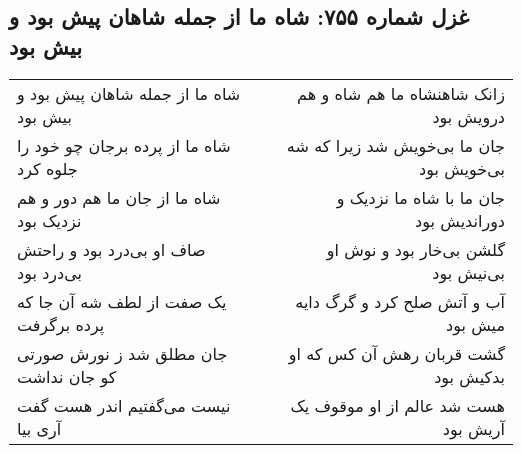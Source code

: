 \begin{center}
\section*{غزل شماره ۷۵۵: شاه ما از جمله شاهان پیش بود و بیش بود}
\label{sec:0755}
\begin{longtable}{l p{0.5cm} r}
شاه ما از جمله شاهان پیش بود و بیش بود
&&
زانک شاهنشاه ما هم شاه و هم درویش بود
\\
شاه ما از پرده برجان چو خود را جلوه کرد
&&
جان ما بی‌خویش شد زیرا که شه بی‌خویش بود
\\
شاه ما از جان ما هم دور و هم نزدیک بود
&&
جان ما با شاه ما نزدیک و دوراندیش بود
\\
صاف او بی‌درد بود و راحتش بی‌درد بود
&&
گلشن بی‌خار بود و نوش او بی‌نیش بود
\\
یک صفت از لطف شه آن جا که پرده برگرفت
&&
آب و آتش صلح کرد و گرگ دایه میش بود
\\
جان مطلق شد ز نورش صورتی کو جان نداشت
&&
گشت قربان رهش آن کس که او بدکیش بود
\\
نیست می‌گفتیم اندر هست گفت آری بیا
&&
هست شد عالم از او موقوف یک آریش بود
\\
\end{longtable}
\end{center}

